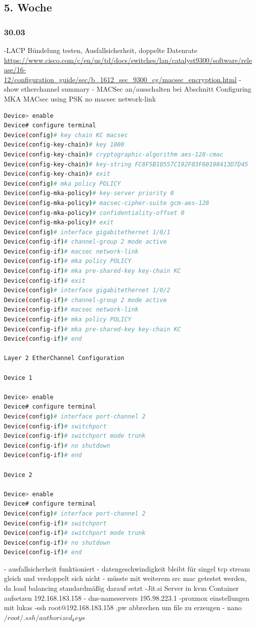 \documentclass[english,runningheads,a4paper]{llncs}[2018/03/10]
\begin{document}
\subsection{5. Woche}
\subsubsection{30.03}
-LACP Bündelung testen, Ausfallsicherheit, doppelte Datenrate \url{https://www.cisco.com/c/en/us/td/docs/switches/lan/catalyst9300/software/release/16-12/configuration_guide/sec/b_1612_sec_9300_cg/macsec_encryption.html}
-show etherchannel summary
- MACSec an/ausschalten bei Abschnitt Configuring MKA MACsec using PSK no macsec network-link
\begin{lstlisting}[language=bash]
Device> enable
Device# configure terminal
Device(config)# key chain KC macsec
Device(config-key-chain)# key 1000
Device(config-key-chain)# cryptographic-algorithm aes-128-cmac
Device(config-key-chain)# key-string FC8F5B10557C192F03F60198413D7D45
Device(config-key-chain)# exit
Device(config)# mka policy POLICY
Device(config-mka-policy)# key-server priority 0
Device(config-mka-policy)# macsec-cipher-suite gcm-aes-128
Device(config-mka-policy)# confidentiality-offset 0
Device(config-mka-policy)# exit
Device(config)# interface gigabitethernet 1/0/1
Device(config-if)# channel-group 2 mode active
Device(config-if)# macsec network-link
Device(config-if)# mka policy POLICY
Device(config-if)# mka pre-shared-key key-chain KC
Device(config-if)# exit
Device(config)# interface gigabitethernet 1/0/2
Device(config-if)# channel-group 2 mode active
Device(config-if)# macsec network-link
Device(config-if)# mka policy POLICY
Device(config-if)# mka pre-shared-key key-chain KC
Device(config-if)# end

Layer 2 EtherChannel Configuration

Device 1

Device> enable
Device# configure terminal
Device(config)# interface port-channel 2
Device(config-if)# switchport
Device(config-if)# switchport mode trunk
Device(config-if)# no shutdown
Device(config-if)# end

Device 2

Device> enable
Device# configure terminal
Device(config)# interface port-channel 2
Device(config-if)# switchport
Device(config-if)# switchport mode trunk
Device(config-if)# no shutdown
Device(config-if)# end
\end{lstlisting}
- ausfallsicherheit funktioniert
- datengeschwindigkeit bleibt für singel tcp stream gleich und verdoppelt sich nicht
- müsste mit weiterem src mac getestet werden, da load balancing standardmäßig darauf setzt
-Jit.si Server in kvm Container aufsetzen 192.168.183.158
- dns-nameservers 195.98.223.1
-proxmox einstellungen mit lukas
-ssh root@192.168.183.158 ,pw abbrechen um file zu erzeugen
- nano $/root/.ssh/authorized_keys$
\end{document}
